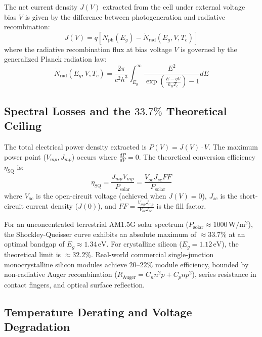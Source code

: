 The net current density $J(V)$ extracted from the cell under external voltage bias $V$ is given by the difference between photogeneration and radiative recombination:
\begin{equation}
J(V) = q \left[ \dot{N}_{\mathrm{ph}}(E_g) - \dot{N}_{\mathrm{rad}}(E_g, V, T_c) \right]
\label{eq:sq_current_density}
\end{equation}
where the radiative recombination flux at bias voltage $V$ is governed by the generalized Planck radiation law:
\begin{equation}
\dot{N}_{\mathrm{rad}}(E_g, V, T_c) = \frac{2\pi}{c^2 h^3} \int_{E_g}^{\infty} \frac{E^2}{\exp\left(\frac{E - qV}{k_B T_c}\right) - 1} dE
\label{eq:generalized_planck}
\end{equation}

\subsection{Spectral Losses and the \texorpdfstring{$33.7\%$}{33.7\%} Theoretical Ceiling}

The total electrical power density extracted is $P(V) = J(V) \cdot V$. The maximum power point ($V_{mp}, J_{mp}$) occurs where $\frac{dP}{dV} = 0$. The theoretical conversion efficiency $\eta_{\mathrm{SQ}}$ is:
\begin{equation}
\eta_{\mathrm{SQ}} = \frac{J_{mp} V_{mp}}{P_{\mathrm{solar}}} = \frac{V_{oc} J_{sc} FF}{P_{\mathrm{solar}}}
\label{eq:sq_efficiency}
\end{equation}
where $V_{oc}$ is the open-circuit voltage (achieved when $J(V) = 0$), $J_{sc}$ is the short-circuit current density ($J(0)$), and $FF = \frac{V_{mp} J_{mp}}{V_{oc} J_{sc}}$ is the fill factor.

For an unconcentrated terrestrial AM1.5G solar spectrum ($P_{\mathrm{solar}} \approx 1000\,\mathrm{W/m^2}$), the Shockley-Queisser curve exhibits an absolute maximum of $\approx 33.7\%$ at an optimal bandgap of $E_g \approx 1.34\,\mathrm{eV}$. For crystalline silicon ($E_g = 1.12\,\mathrm{eV}$), the theoretical limit is $\approx 32.2\%$. Real-world commercial single-junction monocrystalline silicon modules achieve $20$--$22\%$ module efficiency, bounded by non-radiative Auger recombination ($R_{\mathrm{Auger}} = C_n n^2 p + C_p n p^2$), series resistance in contact fingers, and optical surface reflection.

\subsection{Temperature Derating and Voltage Degradation}

